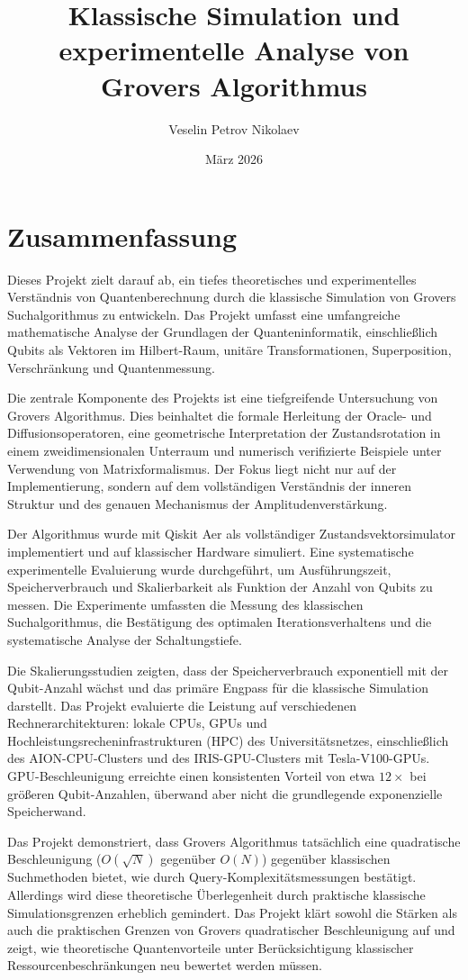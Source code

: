 \documentclass[11pt, a4paper]{article}
\title{Klassische Simulation und experimentelle Analyse von Grovers Algorithmus}
\author{Veselin Petrov Nikolaev}
\date{März 2026}
\begin{document}
\maketitle

\section*{Zusammenfassung}

Dieses Projekt zielt darauf ab, ein tiefes theoretisches und experimentelles Verständnis von Quantenberechnung durch die klassische Simulation von Grovers Suchalgorithmus zu entwickeln. Das Projekt umfasst eine umfangreiche mathematische Analyse der Grundlagen der Quanteninformatik, einschließlich Qubits als Vektoren im Hilbert-Raum, unitäre Transformationen, Superposition, Verschränkung und Quantenmessung.

Die zentrale Komponente des Projekts ist eine tiefgreifende Untersuchung von Grovers Algorithmus. Dies beinhaltet die formale Herleitung der Oracle- und Diffusionsoperatoren, eine geometrische Interpretation der Zustandsrotation in einem zweidimensionalen Unterraum und numerisch verifizierte Beispiele unter Verwendung von Matrixformalismus. Der Fokus liegt nicht nur auf der Implementierung, sondern auf dem vollständigen Verständnis der inneren Struktur und des genauen Mechanismus der Amplitudenverstärkung.

Der Algorithmus wurde mit Qiskit Aer als vollständiger Zustandsvektorsimulator implementiert und auf klassischer Hardware simuliert. Eine systematische experimentelle Evaluierung wurde durchgeführt, um Ausführungszeit, Speicherverbrauch und Skalierbarkeit als Funktion der Anzahl von Qubits zu messen. Die Experimente umfassten die Messung des klassischen Suchalgorithmus, die Bestätigung des optimalen Iterationsverhaltens und die systematische Analyse der Schaltungstiefe.

Die Skalierungsstudien zeigten, dass der Speicherverbrauch exponentiell mit der Qubit-Anzahl wächst und das primäre Engpass für die klassische Simulation darstellt. Das Projekt evaluierte die Leistung auf verschiedenen Rechnerarchitekturen: lokale CPUs, GPUs und Hochleistungsrecheninfrastrukturen (HPC) des Universitätsnetzes, einschließlich des AION-CPU-Clusters und des IRIS-GPU-Clusters mit Tesla-V100-GPUs. GPU-Beschleunigung erreichte einen konsistenten Vorteil von etwa $12{\times}$ bei größeren Qubit-Anzahlen, überwand aber nicht die grundlegende exponenzielle Speicherwand.

Das Projekt demonstriert, dass Grovers Algorithmus tatsächlich eine quadratische Beschleunigung ($O(\sqrt{N})$ gegenüber $O(N)$) gegenüber klassischen Suchmethoden bietet, wie durch Query-Komplexitätsmessungen bestätigt. Allerdings wird diese theoretische Überlegenheit durch praktische klassische Simulationsgrenzen erheblich gemindert. Das Projekt klärt sowohl die Stärken als auch die praktischen Grenzen von Grovers quadratischer Beschleunigung auf und zeigt, wie theoretische Quantenvorteile unter Berücksichtigung klassischer Ressourcenbeschränkungen neu bewertet werden müssen.
\end{document}
